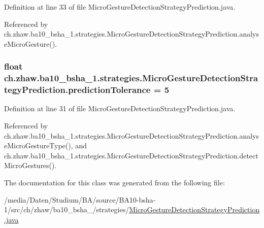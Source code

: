 Definition at line 33 of file MicroGestureDetectionStrategyPrediction.java.

Referenced by ch.zhaw.ba10\_\-bsha\_\-1.strategies.MicroGestureDetectionStrategyPrediction.analyseMicroGesture().\hypertarget{classch_1_1zhaw_1_1ba10__bsha__1_1_1strategies_1_1MicroGestureDetectionStrategyPrediction_ad38574af775edfe073493925952ea556}{
\subsubsection[{predictionTolerance}]{\setlength{\rightskip}{0pt plus 5cm}float {\bf ch.zhaw.ba10\_\-bsha\_\-1.strategies.MicroGestureDetectionStrategyPrediction.predictionTolerance} = 5}}
\label{classch_1_1zhaw_1_1ba10__bsha__1_1_1strategies_1_1MicroGestureDetectionStrategyPrediction_ad38574af775edfe073493925952ea556}


Definition at line 31 of file MicroGestureDetectionStrategyPrediction.java.

Referenced by ch.zhaw.ba10\_\-bsha\_\-1.strategies.MicroGestureDetectionStrategyPrediction.analyseMicroGestureType(), and ch.zhaw.ba10\_\-bsha\_\-1.strategies.MicroGestureDetectionStrategyPrediction.detectMicroGestures().

The documentation for this class was generated from the following file:\begin{DoxyCompactItemize}
\item 
/media/Daten/Studium/BA/source/BA10-\/bsha-\/1/src/ch/zhaw/ba10\_\-bsha\_/strategies/\hyperlink{MicroGestureDetectionStrategyPrediction_8java}{MicroGestureDetectionStrategyPrediction.java}\end{DoxyCompactItemize}
